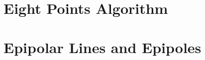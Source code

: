 \documentclass{report}
\begin{document}
	\section{Eight Points Algorithm}
	\startsection
	\closesection

	\section{Epipolar Lines and Epipoles}
	\startsection
	\closesection
\end{document}
